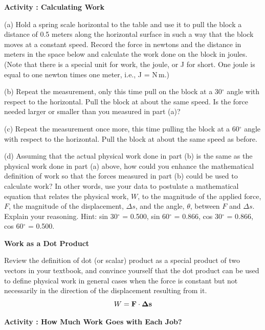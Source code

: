 \textbf{Activity  : Calculating Work} 

(a) Hold a spring scale horizontal to the table and use it to pull the block
a distance of 0.5 meters along the horizontal surface in such a way that the
block moves at a constant speed. Record the force in newtons and the distance
in meters in the space below and calculate the work done on the block in joules.
(Note that there is a special unit for work, the joule, or J for short. 
One joule is equal to one newton times one meter, i.e., J = N\,m.)
\vspace{20mm}

\newpage

(b) Repeat the measurement, only this time pull on the block at a 30\( ^{\circ } \) 
angle with respect to the horizontal. 
Pull the block at about the same speed. Is the force needed larger or smaller than you measured in part (a)?
\vspace{20mm}

(c) Repeat the measurement once more, this time pulling the block at a 60\( ^{\circ } \) 
angle with respect to the horizontal.  
Pull the block at about the same speed as before.
\vspace{20mm}

(d) Assuming that the actual physical work done in part (b) is the same as the
physical work done in part (a) above, how could you enhance the mathematical
definition of work so that the forces measured in part (b) could be used to
calculate work? In other words, use your data to postulate a mathematical equation
that relates the physical work, $W$, to the magnitude of the applied force, $F$,
the magnitude of the displacement, \( \Delta  s\), and the angle, \( \theta  \),
between $F$ and \( \Delta  s\). Explain your reasoning. Hint: sin 30\( ^{\circ } \)
= 0.500, sin 60\( ^{\circ } \) = 0.866, cos 30\( ^{\circ } \) = 0.866, cos 60\( ^{\circ } \)
= 0.500.
\vspace{20mm}

\textbf{Work as a Dot Product }

Review the definition of dot (or scalar) product as a special product of two
vectors in your textbook, and convince yourself that the dot product can be
used to define physical work in general cases when the force is constant but
not necessarily in the direction of the displacement resulting from it. 
\[W={\bf F}\cdot {\bf \Delta s}\]


\textbf{Activity  : How Much Work Goes with Each Job? }

